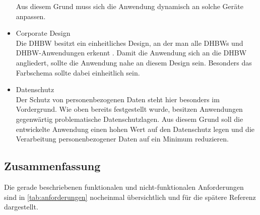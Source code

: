 \begin{itemize}
        Aus diesem Grund muss sich die Anwendung dynamisch an solche Geräte anpassen.
    \item Corporate Design\\
        Die DHBW besitzt ein einheitliches Design, an der man alle DHBWs und DHBW-Anwendungen erkennt \autocite{CD-DHBW}.
        Damit die Anwendung sich an die DHBW angliedert, sollte die Anwendung nahe an diesem Design sein.
        Besonders das Farbschema sollte dabei einheitlich sein.
    \item Datenschutz\\
        Der Schutz von personenbezogenen Daten steht hier besonders im Vordergrund.
        Wie oben bereits festgestellt wurde, besitzen Anwendungen gegenwärtig problematische Datenschutzlagen.
        Aus diesem Grund soll die entwickelte Anwendung einen hohen Wert auf den Datenschutz legen und die Verarbeitung personenbezogener Daten auf ein Minimum reduzieren.
\end{itemize}



\subsection{Zusammenfassung}
Die gerade beschriebenen funktionalen und nicht-funktionalen Anforderungen sind in \autoref{tab:anforderungen} nocheinmal übersichtlich und für die spätere Referenz dargestellt.


